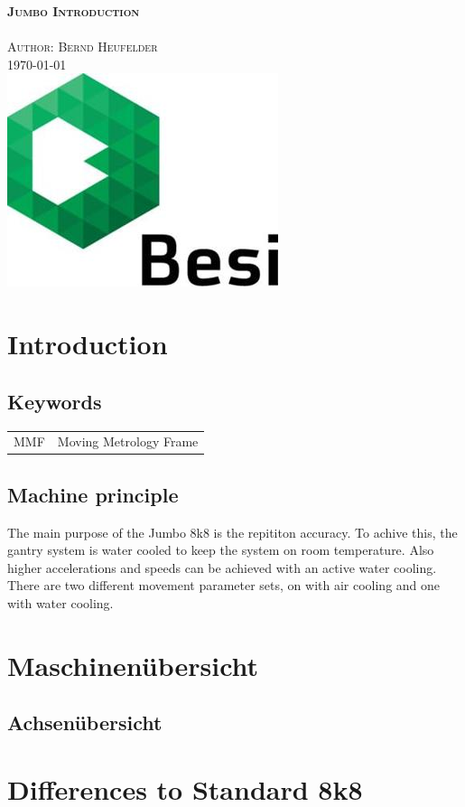\documentclass[a4paper, 12pt]{article}
\begin{document}
	\begin{titlepage}
		\center 
		\textsc{\huge \bfseries Jumbo Introduction}\\[1cm] 
		\textsc{\Large }\\[0.5cm] 
		\textsc{\large Author: Bernd Heufelder}\\[0.5cm] 
		{\large \today}\\[1cm] 
		\includegraphics[width=0.3\linewidth]{./pics/BesiLogo.jpg}\\[1cm]
		\begin{flushleft}
			\tableofcontents
		\end{flushleft}
	\end{titlepage}
	\section{Introduction}
		\subsection{Keywords}
			\begin{tabular}{lc}
				MMF & Moving Metrology Frame
			\end{tabular}
		\subsection{Machine principle}
			The main purpose of the Jumbo 8k8 is the repititon accuracy. To achive this, the gantry system is water cooled to keep the system on room temperature. Also higher accelerations and speeds can be achieved with an active water cooling. There are two different movement parameter sets, on with air cooling and one with water cooling.
	\section{Maschinenübersicht}
		\subsection{Achsenübersicht}
		
	\section{Differences to Standard 8k8}
\end{document}
